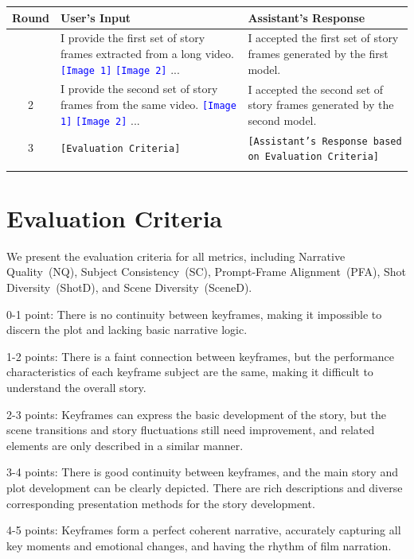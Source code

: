 \begin{longtable}[c]{c|>{\raggedright\arraybackslash}p{5.5cm}|>{\raggedright\arraybackslash}p{6cm}}
\toprule
\textbf{Round} & \textbf{User's Input} & \textbf{Assistant's Response} \\
\midrule
\endfirsthead

\midrule
\endfoot
1 & I provide the first set of story frames extracted from a long video. \newline \texttt{\textcolor{blue}{[Image 1]}} \texttt{\textcolor{blue}{[Image 2]}} ... & I accepted the first set of story frames generated by the first model. \\
\midrule
2 & I provide the second set of story frames from the same video. \newline \texttt{\textcolor{blue}{[Image 1]}} \texttt{\textcolor{blue}{[Image 2]}} ... & I accepted the second set of story frames generated by the second model. \\
\midrule
3 & \texttt{[Evaluation Criteria]} & \texttt{[Assistant's Response based on Evaluation Criteria]} \\
\label{tab:multi-turn prompt}
\end{longtable}


\section{Evaluation Criteria}

We present the evaluation criteria for all metrics, including Narrative Quality~(NQ), Subject Consistency~(SC), Prompt-Frame Alignment~(PFA), Shot Diversity~(ShotD), and Scene Diversity~(SceneD).


\begin{prompt}[title={Narrative Quality}, label=NQ]
0-1 point: There is no continuity between keyframes, making it impossible to discern the plot and lacking basic narrative logic.

1-2 points: There is a faint connection between keyframes, but the performance characteristics of each keyframe subject are the same, making it difficult to understand the overall story.

2-3 points: Keyframes can express the basic development of the story, but the scene transitions and story fluctuations still need improvement, and related elements are only described in a similar manner.

3-4 points: There is good continuity between keyframes, and the main story and plot development can be clearly depicted. There are rich descriptions and diverse corresponding presentation methods for the story development.

4-5 points: Keyframes form a perfect coherent narrative, accurately capturing all key moments and emotional changes, and having the rhythm of film narration.
\end{prompt}


